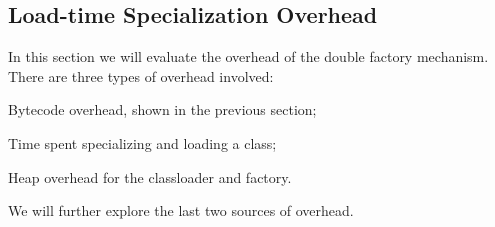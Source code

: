 \subsection{Load-time Specialization Overhead}
\label{subsec-eval-specialization}

In this section we will evaluate the overhead of the double factory mechanism. There are three types of overhead involved:
\begin{packed_item}
  \item Bytecode overhead, shown in the previous section;
  \item Time spent specializing and loading a class;
  \item Heap overhead for the classloader and factory.
\end{packed_item}

We will further explore the last two sources of overhead.

